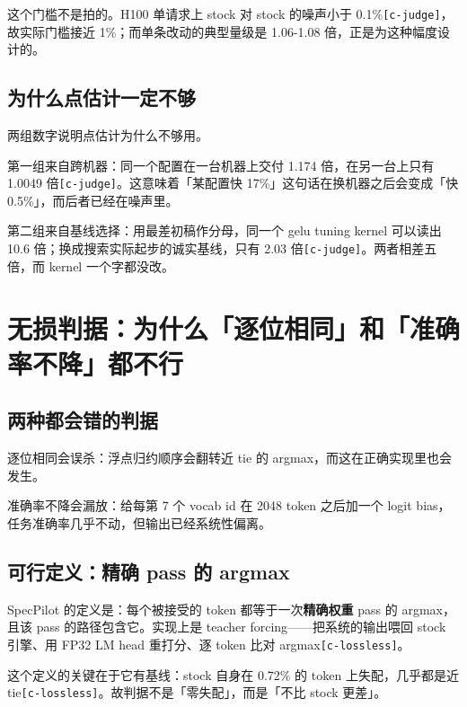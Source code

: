 这个门槛不是拍的。H100 单请求上 stock 对 stock 的噪声小于 0.1\%{\scriptsize\texttt{[c-\hspace{0pt}judge]}}，故实际门槛接近 1\%；而单条改动的典型量级是 1.06-\hspace{0pt}1.08 倍，正是为这种幅度设计的。


\subsection{为什么点估计一定不够}

两组数字说明点估计为什么不够用。


第一组来自跨机器：同一个配置在一台机器上交付 1.174 倍，在另一台上只有 1.0049 倍{\scriptsize\texttt{[c-\hspace{0pt}judge]}}。这意味着「某配置快 17\%」这句话在换机器之后会变成「快 0.5\%」，而后者已经在噪声里。


第二组来自基线选择：用最差初稿作分母，同一个 gelu tuning kernel 可以读出 10.6 倍；换成搜索实际起步的诚实基线，只有 2.03 倍{\scriptsize\texttt{[c-\hspace{0pt}judge]}}。两者相差五倍，而 kernel 一个字都没改。


\section{无损判据：为什么「逐位相同」和「准确率不降」都不行}

\subsection{两种都会错的判据}

逐位相同会误杀：浮点归约顺序会翻转近 tie 的 argmax，而这在正确实现里也会发生。


准确率不降会漏放：给每第 7 个 vocab id 在 2048 token 之后加一个 logit bias，任务准确率几乎不动，但输出已经系统性偏离。


\subsection{可行定义：精确 pass 的 argmax}

SpecPilot 的定义是：每个被接受的 token 都等于一次\textbf{精确权重} pass 的 argmax，且该 pass 的路径包含它。实现上是 teacher forcing——把系统的输出喂回 stock 引擎、用 FP32 LM head 重打分、逐 token 比对 argmax{\scriptsize\texttt{[c-\hspace{0pt}lossless]}}。


这个定义的关键在于它有基线：stock 自身在 0.72\% 的 token 上失配，几乎都是近 tie{\scriptsize\texttt{[c-\hspace{0pt}lossless]}}。故判据不是「零失配」，而是「不比 stock 更差」。


